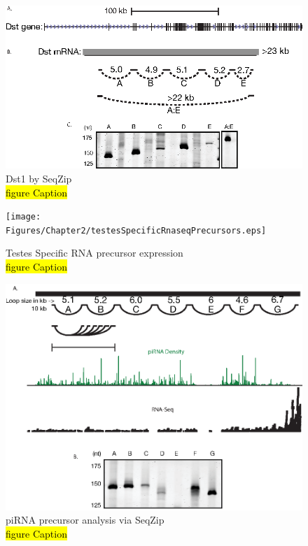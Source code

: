\begin{figure}[htbp]
	\centering 
	\includegraphics{Figures/Chapter2/dst1.eps}
	\caption[Dst1 by SeqZip]
	{
		Dst1 by SeqZip\\
		\hl{figure Caption}
	}
	\label{fig:Hiv tx via SeqZip}
\end{figure}


\begin{figure}[htbp]
	\centering 
	\texttt{[image: Figures/Chapter2/testesSpecificRnaseqPrecursors.eps]}
	\caption[Testes Specific RNA precursor expression]
	{
		Testes Specific RNA precursor expression\\
		\hl{figure Caption}
	}
	\label{fig:Hiv tx via SeqZip}
\end{figure}


\begin{figure}[htbp]
	\centering 
	\includegraphics{Figures/Chapter2/piRNAPrecurserAnalyisBySeqZip.eps}
	\caption[piRNA precursor analysis via SeqZip]
	{
		piRNA precursor analysis via SeqZip\\
		\hl{figure Caption}
	}
	\label{fig:Hiv tx via SeqZip}
\end{figure}


